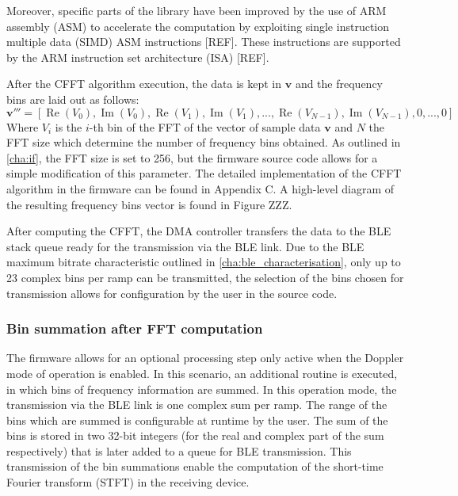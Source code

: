 Moreover, specific parts of the library have been improved by the use of ARM assembly (ASM) to accelerate the computation by exploiting single instruction multiple data (SIMD) ASM instructions [REF]. These instructions are supported by the ARM instruction set architecture (ISA) [REF].

After the CFFT algorithm execution, the data is kept in $\mathbf{v}$ and the frequency bins are laid out as follows:
\begin{equation}
	\mathbf{v'''} = [\operatorname{Re}(V_0), \operatorname{Im}(V_0),\operatorname{Re}(V_1), \operatorname{Im}(V_1), ..., \operatorname{Re}(V_{N-1}), \operatorname{Im}(V_{N-1}),0,...,0]
\end{equation}
Where $V_i$ is the $i$-th bin of the FFT of the vector of sample data $\mathbf{v}$ and $N$ the FFT size which determine the number of frequency bins obtained. As outlined in \cref{cha:if}, the FFT size is set to 256, but the firmware source code allows for a simple modification of this parameter. The detailed implementation of the CFFT algorithm in the firmware can be found in Appendix C. A high-level diagram of the resulting frequency bins vector is found in Figure ZZZ.

After computing the CFFT, the DMA controller transfers the data to the BLE stack queue ready for the transmission via the BLE link. Due to the BLE maximum bitrate characteristic outlined in \cref{cha:ble_characterisation}, only up to 23 complex bins per ramp can be transmitted, the selection of the bins chosen for transmission allows for configuration by the user in the source code.

\subsubsection{Bin summation after FFT computation}

The firmware allows for an optional processing step only active when the Doppler mode of operation is enabled. In this scenario, an additional routine is executed, in which bins of frequency information are summed. In this operation mode, the transmission via the BLE link is one complex sum per ramp. The range of the bins which are summed is configurable at runtime by the user. The sum of the bins is stored in two 32-bit integers (for the real and complex part of the sum respectively) that is later added to a queue for BLE transmission. This transmission of the bin summations enable the computation of the short-time Fourier transform (STFT) in the receiving device.

